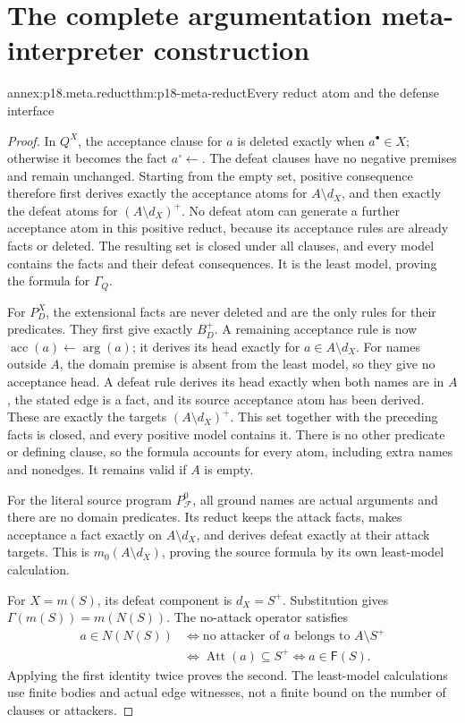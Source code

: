 \section{The complete argumentation meta-interpreter construction}
\label{sec:annex-p18-argumentation-meta-interpreters}

\begin{annexitem}{annex:p18.meta.reduct}{thm:p18-meta-reduct}{Every reduct atom and the defense interface}
\begin{proof}
In \(Q^X\), the acceptance clause for \(a\) is deleted exactly
when \(a^\bullet\in X\); otherwise it becomes the fact
\(a^\circ\leftarrow\). The defeat clauses have no negative
premises and remain unchanged. Starting from the empty set,
positive consequence therefore first derives exactly the
acceptance atoms for \(A\setminus d_X\), and then exactly
the defeat atoms for \((A\setminus d_X)^+\).
No defeat atom can generate a further acceptance atom in
this positive reduct, because its acceptance rules are
already facts or deleted. The resulting set is closed
under all clauses, and every model contains the facts and
their defeat consequences. It is the least model, proving
the formula for \(\Gamma_Q\).

For \(P_D^X\), the extensional facts are never deleted and
are the only rules for their predicates. They first give
exactly \(B_D^+\). A remaining acceptance rule is now
\(\operatorname{acc}(a)\leftarrow\operatorname{arg}(a)\);
it derives its head exactly for \(a\in A\setminus d_X\).
For names outside \(A\), the domain premise is absent from
the least model, so they give no acceptance head. A defeat
rule derives its head exactly when both names are in \(A\),
the stated edge is a fact, and its source acceptance atom
has been derived. These are exactly the targets
\((A\setminus d_X)^+\). This set together with the preceding
facts is closed, and every positive model contains it.
There is no other predicate or defining clause, so the
formula accounts for every atom, including extra names
and nonedges. It remains valid if \(A\) is empty.

For the literal source program \(P^0_{\mathcal F}\), all
ground names are actual arguments and there are no domain
predicates. Its reduct keeps the attack facts, makes
acceptance a fact exactly on \(A\setminus d_X\), and
derives defeat exactly at their attack targets.
This is \(m_0(A\setminus d_X)\), proving the source
formula by its own least-model calculation.

For \(X=m(S)\), its defeat component is \(d_X=S^+\).
Substitution gives \(\Gamma(m(S))=m(N(S))\).
The no-attack operator satisfies
\[
\begin{aligned}
 a\in N(N(S))
 &\Longleftrightarrow
       \text{no attacker of }a\text{ belongs to }A\setminus S^+\\
 &\Longleftrightarrow \operatorname{Att}(a)\subseteq S^+
 \Longleftrightarrow a\in\mathsf F(S).
\end{aligned}
\]
Applying the first identity twice proves the second.
The least-model calculations use finite bodies and actual
edge witnesses, not a finite bound on the number of
clauses or attackers.
\end{proof}
\end{annexitem}

